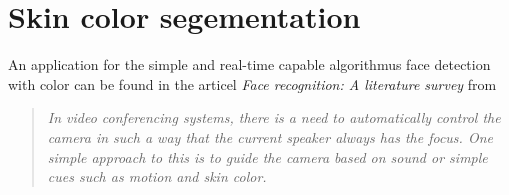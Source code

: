 \documentclass[Bachelorarbeit.tex]{subfiles}
\begin{document}
\section{Skin color segementation}
An application for the simple and real-time capable algorithmus face detection with color can be found in the articel  \textit{Face recognition: A literature survey} from \cite{FRLiteratureSurvey}
\begin{quotation}
\textit{In video conferencing systems, there is a need to automatically control the camera in
such a way that the current speaker always has the focus. One simple approach to this
is to guide the camera based on sound or simple cues such as motion and skin color.}
\end{quotation}
\end{document}
